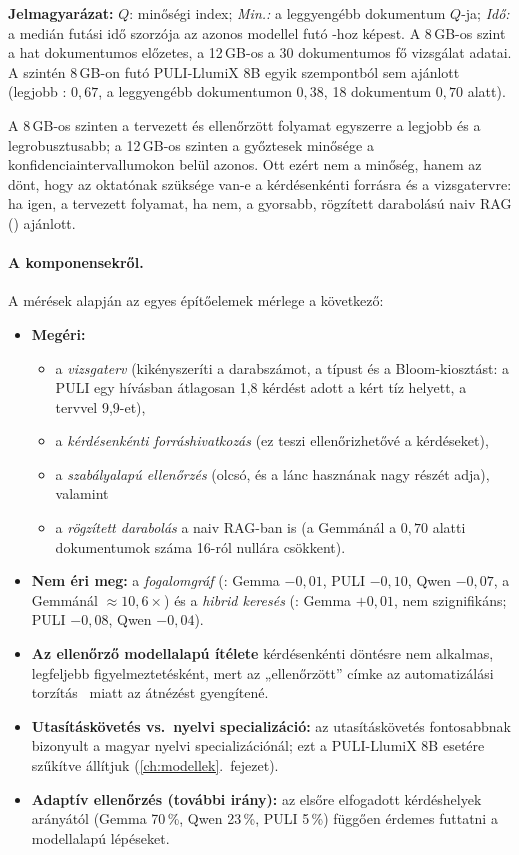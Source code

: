 \begin{table}[htbp]
\smallskip
\parbox{\textwidth}{\footnotesize\textbf{Jelmagyarázat:} $Q$: minőségi index; \emph{Min.:} a leggyengébb dokumentum $Q$-ja; \emph{Idő:} a medián futási idő szorzója az azonos modellel futó -hoz képest. A 8\,GB-os szint a hat dokumentumos előzetes, a 12\,GB-os a 30 dokumentumos fő vizsgálat adatai. A szintén 8\,GB-on futó PULI-LlumiX 8B egyik szempontból sem ajánlott (legjobb : $0{,}67$, a leggyengébb dokumentumon $0{,}38$, 18 dokumentum $0{,}70$ alatt).}
\end{table}

A 8\,GB-os szinten a tervezett és ellenőrzött folyamat egyszerre a legjobb és a legrobusztusabb; a
12\,GB-os szinten a győztesek minősége a konfidenciaintervallumokon belül azonos. Ott ezért nem a minőség,
hanem az dönt, hogy az oktatónak szüksége van-e a kérdésenkénti forrásra és a vizsgatervre: ha igen, a
tervezett folyamat, ha nem, a gyorsabb, rögzített darabolású naiv RAG () ajánlott.

\paragraph{A komponensekről.} A mérések alapján az egyes építőelemek mérlege a következő:
\begin{itemize}[leftmargin=*,itemsep=1pt,topsep=2pt]
\item \textbf{Megéri:}
  \begin{itemize}[leftmargin=*,itemsep=0pt,topsep=1pt]
  \item a \emph{vizsgaterv} (kikényszeríti a darabszámot, a típust és a Bloom-kiosztást: a PULI egy hívásban átlagosan 1,8 kérdést adott a kért tíz helyett, a tervvel 9,9-et),
  \item a \emph{kérdésenkénti forráshivatkozás} (ez teszi ellenőrizhetővé a kérdéseket),
  \item a \emph{szabályalapú ellenőrzés} (olcsó, és a lánc hasznának nagy részét adja), valamint
  \item a \emph{rögzített darabolás} a naiv RAG-ban is (a Gemmánál a $0{,}70$ alatti dokumentumok száma 16-ról nullára csökkent).
  \end{itemize}
\item \textbf{Nem éri meg:} a \emph{fogalomgráf} (: Gemma $-0{,}01$, PULI $-0{,}10$, Qwen $-0{,}07$, a Gemmánál $\approx10{,}6\times$) és a \emph{hibrid keresés} (: Gemma $+0{,}01$, nem szignifikáns; PULI $-0{,}08$, Qwen $-0{,}04$).
\item \textbf{Az ellenőrző modellalapú ítélete} kérdésenkénti döntésre nem alkalmas, legfeljebb figyelmeztetésként, mert az „ellenőrzött” címke az automatizálási torzítás~\cite{parasuraman2010complacency} miatt az átnézést gyengítené.
\item \textbf{Utasításkövetés vs.\ nyelvi specializáció:} az utasításkövetés fontosabbnak bizonyult a magyar nyelvi specializációnál; ezt a PULI-LlumiX 8B esetére szűkítve állítjuk (\ref{ch:modellek}.~fejezet).
\item \textbf{Adaptív ellenőrzés (további irány):} az elsőre elfogadott kérdéshelyek arányától (Gemma 70\,\%, Qwen 23\,\%, PULI 5\,\%) függően érdemes futtatni a modellalapú lépéseket.
\end{itemize}

